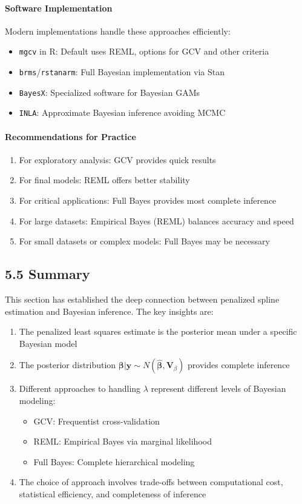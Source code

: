 \documentclass[11pt, a4paper]{article}
\begin{document}
\paragraph{Software Implementation}
Modern implementations handle these approaches efficiently:
\begin{itemize}
\item \texttt{mgcv} in R: Default uses REML, options for GCV and other criteria
\item \texttt{brms}/\texttt{rstanarm}: Full Bayesian implementation via Stan
\item \texttt{BayesX}: Specialized software for Bayesian GAMs
\item \texttt{INLA}: Approximate Bayesian inference avoiding MCMC
\end{itemize}

\paragraph{Recommendations for Practice}
\begin{enumerate}
\item For exploratory analysis: GCV provides quick results
\item For final models: REML offers better stability
\item For critical applications: Full Bayes provides most complete inference
\item For large datasets: Empirical Bayes (REML) balances accuracy and speed
\item For small datasets or complex models: Full Bayes may be necessary
\end{enumerate}

\subsection{5.5 Summary}
This section has established the deep connection between penalized spline estimation and Bayesian inference. The key insights are:

\begin{enumerate}
\item The penalized least squares estimate is the posterior mean under a specific Bayesian model
\item The posterior distribution $\boldsymbol{\beta}|\mathbf{y} \sim N(\hat{\boldsymbol{\beta}}, \mathbf{V}_{\beta})$ provides complete inference
\item Different approaches to handling $\lambda$ represent different levels of Bayesian modeling:
   \begin{itemize}
   \item GCV: Frequentist cross-validation
   \item REML: Empirical Bayes via marginal likelihood
   \item Full Bayes: Complete hierarchical modeling
   \end{itemize}
\item The choice of approach involves trade-offs between computational cost, statistical efficiency, and completeness of inference
\end{enumerate}
\end{document}
